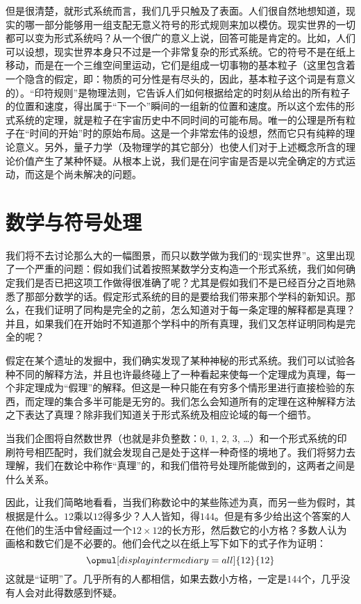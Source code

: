 但是很清楚，就形式系统而言，我们几乎只触及了表面。人们很自然地想知道，现实的哪一部分能够用一组支配无意义符号的形式规则来加以模仿。现实世界的一切都可以变为形式系统吗？从一个很广的意义上说，回答可能是肯定的。比如，人们可以设想，现实世界本身只不过是一个非常复杂的形式系统。它的符号不是在纸上移动，而是在一个三维空间里运动，它们是组成一切事物的基本粒子（这里包含着一个隐含的假定，即：物质的可分性是有尽头的，因此，基本粒子这个词是有意义的）。“印符规则”是物理法则，它告诉人们如何根据给定的时刻从给出的所有粒子的位置和速度，得出属于“下一个”瞬间的一组新的位置和速度。所以这个宏伟的形式系统的定理，就是粒子在宇宙历史中不同时间的可能布局。唯一的公理是所有粒子在“时间的开始”时的原始布局。这是一个非常宏伟的设想，然而它只有纯粹的理论意义。另外，量子力学（及物理学的其它部分）也使人们对于上述概念所含的理论价值产生了某种怀疑。从根本上说，我们是在问宇宙是否是以完全确定的方式运动，而这是个尚未解决的问题。

\section{数学与符号处理}

我们将不去讨论那么大的一幅图景，而只以数学做为我们的“现实世界”。这里出现了一个严重的问题：假如我们试着按照某数学分支构造一个形式系统，我们如何确定我们是否已把这项工作做得很准确了呢？尤其是假如我们不是已经百分之百地熟悉了那部分数学的话。假定形式系统的目的是要给我们带来那个学科的新知识。那么，在我们证明了同构是完全的之前，怎么知道对于每一条定理的解释都是真理？并且，如果我们在开始时不知道那个学科中的所有真理，我们又怎样证明同构是完全的呢？

假定在某个遗址的发掘中，我们确实发现了某种神秘的形式系统。我们可以试验各种不同的解释方法，并且也许最终碰上了一种看起来使每一个定理成为真理，每一个非定理成为“假理”的解释。但这是一种只能在有穷多个情形里进行直接检验的东西，而定理的集合多半可能是无穷的。我们怎么会知道所有的定理在这种解释方法之下表达了真理？除非我们知道关于形式系统及相应论域的每一个细节。

当我们企图将自然数世界（也就是非负整数：$0$, $1$, $2$, $3$, \ldots）和一个形式系统的印刷符号相匹配时，我们就会发现自己是处于这样一种奇怪的境地了。我们将努力去理解，我们在数论中称作“真理”的，和我们借符号处理所能做到的，这两者之间是什么关系。

因此，让我们简略地看看，当我们称数论中的某些陈述为真，而另一些为假时，其根据是什么。$12$乘以$12$得多少？人人皆知，得$144$。但是有多少给出这个答案的人在他们的生活中曾经画过一个$12\times 12$的长方形，然后数它的小方格？多数人认为画格和数它们是不必要的。他们会代之以在纸上写下如下的式子作为证明：
\[
  \opmul[displayintermediary=all]{12}{12}
\]
这就是“证明”了。几乎所有的人都相信，如果去数小方格，一定是$144$个，几乎没有人会对此得数感到怀疑。

